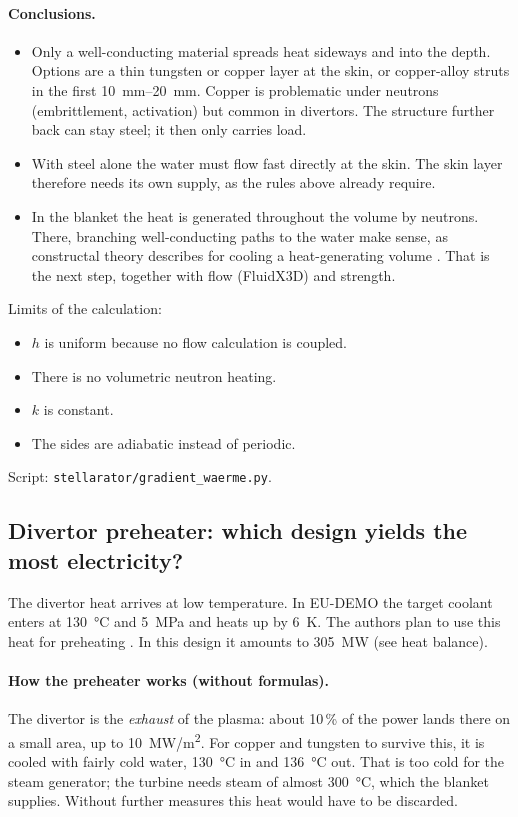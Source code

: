 \documentclass[10pt,a4paper]{article}
\begin{document}
\paragraph{Conclusions.}
\begin{itemize}
\item Only a well-conducting material spreads heat sideways and into the depth. Options are a thin tungsten or copper layer at the skin, or copper-alloy struts in the first \SIrange{10}{20}{mm}. Copper is problematic under neutrons (embrittlement, activation) but common in divertors. The structure further back can stay steel; it then only carries load.
\item With steel alone the water must flow fast directly at the skin. The skin layer therefore needs its own supply, as the rules above already require.
\item In the blanket the heat is generated throughout the volume by neutrons. There, branching well-conducting paths to the water make sense, as constructal theory describes for cooling a heat-generating volume \cite{bejan1997}. That is the next step, together with flow (FluidX3D) and strength.
\end{itemize}
Limits of the calculation:
\begin{itemize}
\item $h$ is uniform because no flow calculation is coupled.
\item There is no volumetric neutron heating.
\item $k$ is constant.
\item The sides are adiabatic instead of periodic.
\end{itemize}
Script: \texttt{stellarator/gradient\_waerme.py}.

\subsection{Divertor preheater: which design yields the most electricity?}\label{sec:preheater}
The divertor heat arrives at low temperature. In EU-DEMO the target coolant enters at \SI{130}{\celsius} and
\SI{5}{MPa} and heats up by \SI{6}{K}. The authors plan to use this heat for preheating \cite{you2022}. In this
design it amounts to \SI{305}{MW} (see heat balance).

\paragraph{How the preheater works (without formulas).} The divertor is the \emph{exhaust} of the plasma: about
10\,\% of the power lands there on a small area, up to \SI{10}{MW/m^2}. For copper and tungsten to survive this, it
is cooled with fairly cold water, \SI{130}{\celsius} in and \SI{136}{\celsius} out. That is too cold for the steam
generator; the turbine needs steam of almost \SI{300}{\celsius}, which the blanket supplies. Without further measures
this heat would have to be discarded.
\end{document}
